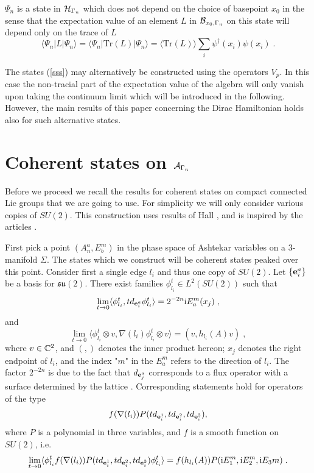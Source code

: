 \documentclass[12pt]{article}
\def\G{\Gamma}
\def\ca{{\cal A}}
\def\cb{{\cal B}}
\def\ch{{\cal H}}
\newcommand{\bbC}{{\Bbb C}}
\begin{document}
$\Psi_n$ is a state in $\ch_{\G_n}$ which does not depend on the choice of basepoint $x_0$ in the sense that the expectation value of an element $L$ in $\cb_{x_0,\G_n}$ on this state will depend only on the trace of $L$
\begin{equation}
\langle \Psi_{n} \vert L \vert \Psi_{n}\rangle =\langle \Psi_{n} \vert  \mbox{Tr}(L) \vert \Psi_{n}\rangle = \langle   \mbox{Tr}(L)\rangle\sum_i \psi^\dagger(x_i)\psi(x_i)\;.
\label{indy}
\end{equation}

 

The states (\ref{sss}) may alternatively be constructed using the operators $V_p$. In this case the non-tracial part of the expectation value of the algebra will only vanish upon taking the continuum limit which will be introduced in the following. However, the main results of this paper concerning the Dirac Hamiltonian holds also for such alternative states.




\section{Coherent states on $\ca_{\G_n}$}

Before we proceed we recall the results for coherent states on compact connected Lie groups that we are going to use. For simplicity we will only consider various copies of $SU(2)$. This construction uses results of Hall \cite{H1,H2}, and is inspired by the articles \cite{BT1,TW,BT2}.

First pick a point $(A_n^a,E^m_b)$ in the phase space of Ashtekar variables on a 3-manifold $\Sigma$. The states which we construct will be coherent states peaked over this point.
Consider first a single edge $l_i$ and thus one copy of $SU(2)$. Let $\{{\bf e}^a_i\}$ be a basis for $\mathfrak{su}(2)$. 
There exist families $\phi^t_{l_i}\in L^2(SU(2))$ such that
$$ \lim_{t \to 0}\langle \phi^t_{l_i}, t d_{{\bf e}^a_i}\phi_{l_i}^t \rangle=2^{-2n}\mathrm{i}E_a^m(x_{j})\;,$$
and
$$\lim_{t \to 0}\langle \phi_{l_i}^t\otimes v, \nabla(l_i)\phi_{l_i}^t\otimes v \rangle=(v,h_{l_i}(A)v)\;,$$
where $v \in \bbC^2$, and $(,)$ denotes the inner product hereon; $x_{j}$ denotes the right endpoint of $l_i$, and the index "$m$" in the $E^m_a$ refers to the direction of $l_i$. The factor $2^{-2n}$ is due to the fact that $d_{{\bf e}_j^a}$ corresponds to a flux operator with a surface determined by the lattice \cite{AGNP1}.
Corresponding statements hold for operators of the type $$f(\nabla(l_i))P(t d_{{\bf e}^1_i},t d_{{\bf e}^2_i},t d_{{\bf e}^3_i}),$$  where $P$ is a polynomial in three variables, and $f$ is a smooth function on $SU(2)$, i.e.
$$ \lim_{t \to 0}\langle \phi^t_{l_i} f(\nabla(l_i))P(t d_{{\bf e}^1_i},t d_{{\bf e}^2_i},t d_{{\bf e}^3_i}) \phi^t_{l_i} \rangle=f(h_{l_i}(A))P(\mathrm{i}E_1^m,\mathrm{i}E_2^m,\mathrm{i}E_3m)\;.$$
\end{document}
